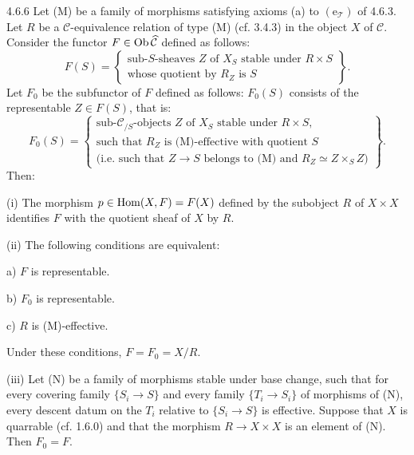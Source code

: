 \begin{theorem}{4.6.6}\label{IV.4.6.6}
Let (M) be a family of morphisms satisfying axioms (a) to
\((\mathrm e_{\mathcal T})\) of 4.6.3.
Let \(R\) be a \(\mathcal C\)-equivalence relation of type
(M) (cf. 3.4.3) in the object \(X\) of \(\mathcal C\).
Consider the functor \(F\in\operatorname{Ob}\widehat{\mathcal C}\)
defined as follows:
\[
F(S)=\left\{\begin{array}{l}
\text{sub-}S\text{-sheaves }Z\text{ of }X_S\text{ stable under }R\times S\\
\text{whose quotient by }R_Z\text{ is }S
\end{array}\right\}.
\]
Let \(F_0\) be the subfunctor of \(F\) defined as follows:
\(F_0(S)\) consists of the representable \(Z\in F(S)\), that is:
\[
F_0(S)=\left\{\begin{array}{l}
\text{sub-}\mathcal C_{/S}\text{-objects }Z\text{ of }X_S
\text{ stable under }R\times S,\\
\text{such that }R_Z\text{ is (M)-effective with quotient }S\\
\text{(i.e. such that }Z\to S\text{ belongs to (M) and }R_Z\simeq Z\times_S Z)
\end{array}\right\}.
\]
Then:

(i) The morphism \(p\in\operatorname{Hom}(X,F)=F(X)\) defined by the
subobject \(R\) of \(X\times X\) identifies \(F\) with the
quotient sheaf of \(X\) by \(R\).

(ii) The following conditions are equivalent:

a) \(F\) is representable.

b) \(F_0\) is representable.

c) \(R\) is (M)-effective.

Under these conditions, \(F=F_0=X/R\).

(iii) Let (N) be a family of morphisms stable under base
change, such that for every covering family \(\{S_i\to S\}\)
and every family \(\{T_i\to S_i\}\) of morphisms of (N),
every descent datum on the \(T_i\) relative to \(\{S_i\to S\}\)
is effective. Suppose that \(X\) is quarrable (cf. 1.6.0)
and that the morphism \(R\to X\times X\) is an element of (N).
Then \(F_0=F\).
\end{theorem}
